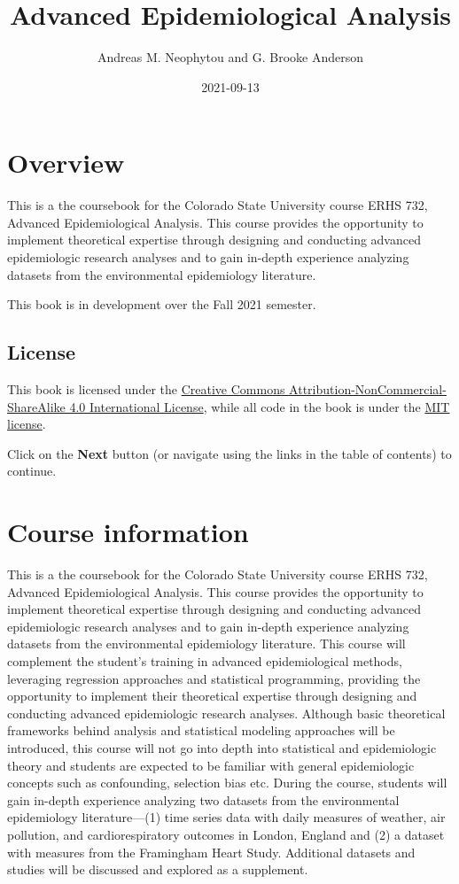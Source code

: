 \documentclass[
]{book}
\title{Advanced Epidemiological Analysis}
\author{Andreas M. Neophytou and G. Brooke Anderson}
\date{2021-09-13}
\begin{document}
\maketitle

{
\setcounter{tocdepth}{1}
\tableofcontents
}
\hypertarget{overview}{%
\chapter{Overview}\label{overview}}

This is a the coursebook for the Colorado State University course ERHS 732,
Advanced Epidemiological Analysis. This course provides the opportunity to
implement theoretical expertise through designing and conducting advanced
epidemiologic research analyses and to gain in-depth experience analyzing
datasets from the environmental epidemiology literature.

This book is in development over the Fall 2021 semester.

\hypertarget{license}{%
\section{License}\label{license}}

This book is licensed under the \href{https://creativecommons.org/licenses/by-nc-sa/4.0/}{Creative Commons
Attribution-NonCommercial-ShareAlike 4.0 International
License}, while all code in
the book is under the \href{https://opensource.org/licenses/MIT}{MIT license}.

Click on the \textbf{Next} button (or navigate using the links in the table of
contents) to continue.

\hypertarget{courseinfo}{%
\chapter{Course information}\label{courseinfo}}

This is a the coursebook for the Colorado State University course ERHS 732,
Advanced Epidemiological Analysis. This course provides the opportunity to
implement theoretical expertise through designing and conducting advanced
epidemiologic research analyses and to gain in-depth experience analyzing
datasets from the environmental epidemiology literature. This course will
complement the student's training in advanced epidemiological methods,
leveraging regression approaches and statistical programming, providing the
opportunity to implement their theoretical expertise through designing and
conducting advanced epidemiologic research analyses. Although basic theoretical frameworks behind analysis and statistical modeling approaches will be introduced, this course will not go into depth into statistical and epidemiologic theory and students are expected to be familiar with general epidemiologic concepts such as confounding, selection bias etc. During the course,
students will gain in-depth experience analyzing two datasets from the
environmental epidemiology literature---(1) time series data with daily measures
of weather, air pollution, and cardiorespiratory outcomes in London, England and
(2) a dataset with measures from the Framingham Heart Study. Additional datasets
and studies will be discussed and explored as a supplement.
\end{document}
